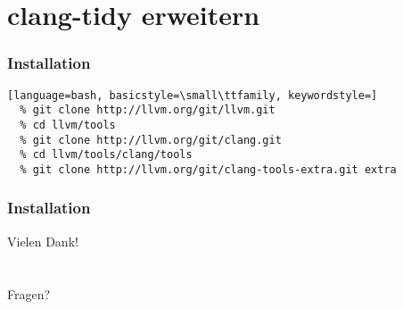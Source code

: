 \documentclass[aspectratio=169]{beamer}
\begin{document}
\section{clang-tidy erweitern}
\begin{frame}[fragile]
  \frametitle{Installation}
  \begin{lstlisting}[language=bash, basicstyle=\small\ttfamily, keywordstyle=]
  % git clone http://llvm.org/git/llvm.git
  % cd llvm/tools
  % git clone http://llvm.org/git/clang.git
  % cd llvm/tools/clang/tools
  % git clone http://llvm.org/git/clang-tools-extra.git extra
  \end{lstlisting}
\end{frame}
\begin{frame}
  \frametitle{Installation}
\end{frame}
\begin{frame}
  \begin{center}
    \Huge{Vielen Dank!}\\
    ~\\
    ~\\
    \Large{Fragen?}
  \end{center}
\end{frame}
\end{document}
